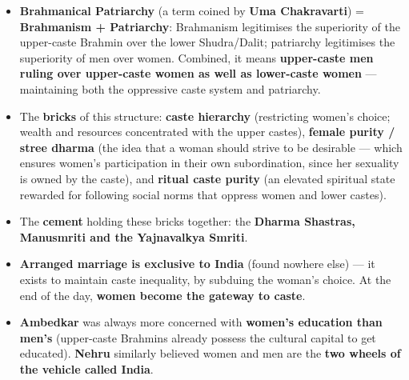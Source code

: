 \begin{KeyConcept}
\begin{itemize}
\item \textbf{Brahmanical Patriarchy} (a term coined by \textbf{Uma Chakravarti}) = \textbf{Brahmanism + Patriarchy}: Brahmanism legitimises the superiority of the upper-caste Brahmin over the lower Shudra/Dalit; patriarchy legitimises the superiority of men over women. Combined, it means \textbf{upper-caste men ruling over upper-caste women as well as lower-caste women} --- maintaining both the oppressive caste system and patriarchy.
\item The \textbf{bricks} of this structure: \textbf{caste hierarchy} (restricting women's choice; wealth and resources concentrated with the upper castes), \textbf{female purity / stree dharma} (the idea that a woman should strive to be desirable --- which ensures women's participation in their own subordination, since her sexuality is owned by the caste), and \textbf{ritual caste purity} (an elevated spiritual state rewarded for following social norms that oppress women and lower castes).
\item The \textbf{cement} holding these bricks together: the \textbf{Dharma Shastras, Manusmriti and the Yajnavalkya Smriti}.
\end{itemize}
\end{KeyConcept}

\begin{KeyConcept}
\begin{itemize}
\item \textbf{Arranged marriage is exclusive to India} (found nowhere else) --- it exists to maintain caste inequality, by subduing the woman's choice. At the end of the day, \textbf{women become the gateway to caste}.
\item \textbf{Ambedkar} was always more concerned with \textbf{women's education than men's} (upper-caste Brahmins already possess the cultural capital to get educated). \textbf{Nehru} similarly believed women and men are the \textbf{two wheels of the vehicle called India}.
\end{itemize}
\end{KeyConcept}

